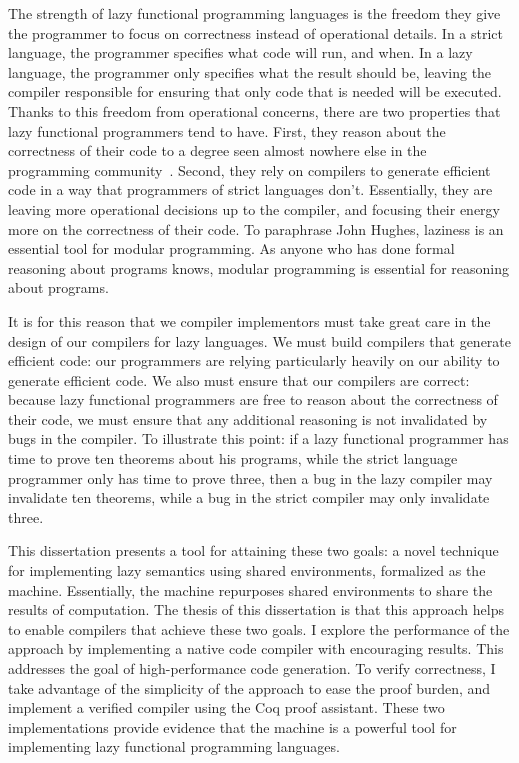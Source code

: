The strength of lazy functional programming languages is the freedom they give
the programmer to focus on correctness instead of operational details. In a
strict language, the programmer specifies what code will run, and when. In a
lazy language, the programmer only specifies what the result should be, leaving
the compiler responsible for ensuring that only code that is needed will be
executed. Thanks to this freedom from operational concerns, there are two
properties that lazy functional programmers tend to have. First, they reason
about the correctness of their code to a degree seen almost nowhere else in the
programming community~\cite{hughes1989functional, spector2018total}.  Second,
they rely on compilers to generate efficient code in a way that programmers of
strict languages don't. Essentially, they are leaving more operational decisions
up to the compiler, and focusing their energy more on the correctness of their
code. To paraphrase John Hughes, laziness is an essential tool for modular
programming. As anyone who has done formal reasoning about programs knows,
modular programming is essential for reasoning about programs. 

It is for this reason that we compiler implementors must take great care in the
design of our compilers for lazy languages. We must build compilers that
generate efficient code: our programmers are relying particularly heavily on
our ability to generate efficient code. We also must ensure that our compilers
are correct: because lazy functional programmers are free to reason about the
correctness of their code, we must ensure that any additional reasoning is not
invalidated by bugs in the compiler. To illustrate this point: if a lazy
functional programmer has time to prove ten theorems about his programs, while
the strict language programmer only has time to prove three, then a bug in the
lazy compiler may invalidate ten theorems, while a bug in the strict compiler
may only invalidate three.

This dissertation presents a tool for attaining these two goals: a novel
technique for implementing lazy semantics using shared environments, formalized
as the \ce machine.  Essentially, the \ce machine repurposes shared environments
to share the results of computation. The thesis of this dissertation is that
this approach helps to enable compilers that achieve these two goals. I explore
the performance of the approach by implementing a native code compiler with
encouraging results. This addresses the goal of high-performance code
generation. To verify correctness, I take advantage of the simplicity of the
approach to ease the proof burden, and implement a verified compiler using the
Coq proof assistant. These two implementations provide evidence that the \ce
machine is a powerful tool for implementing lazy functional programming
languages.

